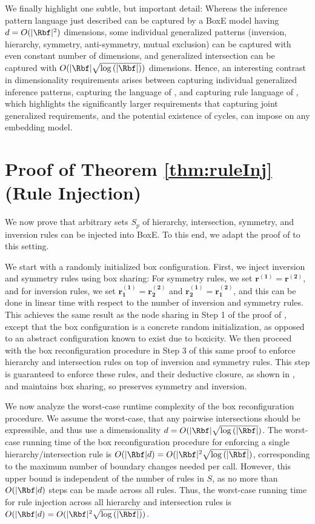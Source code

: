 \documentclass{article}
\begin{document}
We finally highlight one subtle, but important detail: Whereas the inference pattern language just described can be captured by a BoxE model having $d=O(|\Rbf|^2)$ dimensions, some individual generalized patterns (inversion, hierarchy, symmetry, anti-symmetry, mutual exclusion) can be captured with even constant number of dimensions, and generalized intersection can be captured with $O(|\Rbf|\sqrt{\log{(|\Rbf|)}})$ dimensions. Hence, an interesting contrast in dimensionality requirements arises between capturing individual generalized inference patterns, capturing the language of , and capturing rule language of , which highlights the significantly larger requirements that capturing joint generalized requirements, and the potential existence of cycles, can impose on any embedding model. 



\section{Proof of Theorem \ref{thm:ruleInj} (Rule Injection)}
\label{app:ruleInj}

We now prove that arbitrary sets $S_p$ of hierarchy, intersection, symmetry, and inversion rules can be injected into BoxE. To this end, we adapt the proof of  to this setting.

We start with a randomly initialized box configuration. First, we inject inversion and symmetry rules using box sharing: For symmetry rules, we set $\bm{r^{(1)}} = \bm{r^{(2)}}$, and for inversion rules, we set $\bm{r_1^{(1)}}
= \bm{r_2^{(2)}}$ and $\bm{r_2^{(1)}} = \bm{r_1^{(2)}}$, and this can be done in linear time with respect to the number of inversion and symmetry rules. This achieves the same result as the node sharing in Step 1 of the proof of , except that the box configuration is a concrete random initialization, as opposed to an abstract configuration known to exist due to boxicity. We then proceed with the box reconfiguration procedure in Step 3 of this same proof to enforce hierarchy and intersection rules on top of inversion and symmetry rules. This step is guaranteed to enforce these rules, and their deductive closure, as shown in , and maintains box sharing, so preserves symmetry and inversion. 

We now analyze the worst-case runtime complexity of the box reconfiguration procedure. We assume the worst-case, that any pairwise intersections should be expressible, and thus use a dimensionality $d = O(|\Rbf|\sqrt{\log{(|\Rbf|}})$. The worst-case running time of the box reconfiguration procedure 
for enforcing a single hierarchy/intersection rule is $O(|\Rbf|d) = O(|\Rbf|^2\sqrt{\log{(|\Rbf|}})$, corresponding to the maximum number of boundary changes needed per call. However, this upper bound is independent of the number of rules in $S$, as no more than $O(|\Rbf|d)$ steps can be made across all rules. Thus, the worst-case running time for rule injection across all hierarchy and intersection rules is $O(|\Rbf|d) = O(|\Rbf|^2\sqrt{\log{(|\Rbf|)}})$. 
\end{document}
